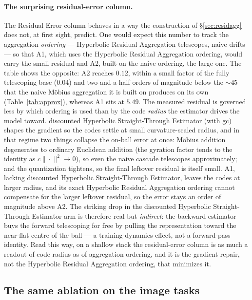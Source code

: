 \documentclass[12pt]{report}
\begin{document}
\paragraph{The surprising residual-error column.} The Residual Error column behaves in a way the construction of \S\ref{sec:residagg} does not, at first sight, predict. One would expect this number to track the aggregation \emph{ordering} --- Hyperbolic Residual Aggregation telescopes, naive drifts --- so that A1, which uses the Hyperbolic Residual Aggregation ordering, would carry the small residual and A2, built on the naive ordering, the large one. The table shows the opposite: A2 reaches $0.12$, within a small factor of the fully telescoping base ($0.04$) and two-and-a-half orders of magnitude below the $\sim\!45$ that the naive M\"obius aggregation it is built on produces on its own (Table~\ref{tab:approx}), whereas A1 sits at $5.49$. The measured residual is governed less by which ordering is used than by the code \emph{radius} the estimator drives the model toward. discounted Hyperbolic Straight-Through Estimator (with gc) shapes the gradient so the codes settle at small curvature-scaled radius, and in that regime two things collapse the on-ball error at once: M\"obius addition degenerates to ordinary Euclidean addition (the gyration factor tends to the identity as $c\|\cdot\|^2\!\to\!0$), so even the naive cascade telescopes approximately; and the quantization tightens, so the final leftover residual is itself small. A1, lacking discounted Hyperbolic Straight-Through Estimator, leaves the codes at larger radius, and its exact Hyperbolic Residual Aggregation ordering cannot compensate for the larger leftover residual, so the error stays an order of magnitude above A2. The striking drop in the discounted Hyperbolic Straight-Through Estimator arm is therefore real but \emph{indirect}: the backward estimator buys the forward telescoping for free by pulling the representation toward the near-flat centre of the ball --- a training-dynamics effect, not a forward-pass identity. Read this way, on a shallow stack the residual-error column is as much a readout of code radius as of aggregation ordering, and it is the gradient repair, not the Hyperbolic Residual Aggregation ordering, that minimizes it.

\subsection{The same ablation on the image tasks}
\label{sec:abl_components_img}
\end{document}
